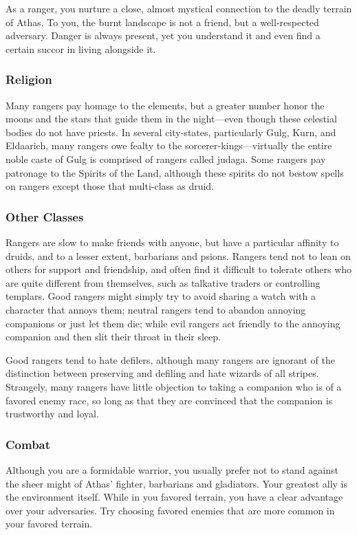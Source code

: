 As a ranger, you nurture a close, almost mystical connection to the deadly terrain of Athas. To you, the burnt landscape is not a friend, but a well-respected adversary. Danger is always present, yet you understand it and even find a certain succor in living alongside it.

\subsubsection{Religion}

Many rangers pay homage to the elements, but a greater number honor the moons and the stars that guide them in the night---even though these celestial bodies do not have priests. In several city-states, particularly Gulg,
Kurn, and Eldaarich, many rangers owe fealty to the sorcerer-kings---virtually the entire noble caste of Gulg is comprised of rangers called judaga. Some rangers pay patronage to the Spirits of the Land, although these spirits do not bestow spells on rangers except those that multi-class as druid.

\subsubsection{Other Classes}

Rangers are slow to make friends with anyone, but have a particular affinity to druids, and to a lesser extent, barbarians and psions. Rangers tend not to lean on others for support and friendship, and often find it difficult to tolerate others who are quite different from themselves, such as talkative traders or controlling templars. Good rangers might simply try to avoid sharing a watch with a character that annoys them; neutral rangers tend to abandon annoying companions or just let them die; while evil rangers act friendly to the annoying companion and then slit their throat in their sleep.

Good rangers tend to hate defilers, although many rangers are ignorant of the distinction between preserving and defiling and hate wizards of all stripes. Strangely, many rangers have little objection to taking a companion who is of a favored enemy race, so long as that they are convinced that the companion is trustworthy and loyal.

\subsubsection{Combat}

Although you are a formidable warrior, you usually prefer not to stand against the sheer might of Athas' fighter, barbarians and gladiators. Your greatest ally is the environment itself. While in you favored terrain, you have a clear advantage over your adversaries. Try choosing favored enemies that are more common in your favored terrain.


